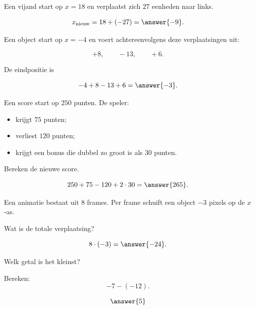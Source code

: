\documentclass{ximera}
\begin{document}
\begin{problem}
Een vijand start op $x=18$ en verplaatst zich $27$ eenheden naar links.

\[
x_{\text{nieuw}}=18+(-27)=\answer{-9}.
\]
\end{problem}

\begin{problem}
Een object start op $x=-4$ en voert achtereenvolgens deze verplaatsingen uit:

\[
+8,\qquad -13,\qquad +6.
\]

De eindpositie is

\[
-4+8-13+6=\answer{-3}.
\]
\end{problem}

\begin{problem}
Een score start op $250$ punten. De speler:

\begin{itemize}
    \item krijgt $75$ punten;
    \item verliest $120$ punten;
    \item krijgt een bonus die dubbel zo groot is als $30$ punten.
\end{itemize}

Bereken de nieuwe score.

\[
250+75-120+2\cdot30=\answer{265}.
\]
\end{problem}

\begin{problem}
Een animatie bestaat uit $8$ frames. Per frame schuift een object $-3$ pixels
op de $x$-as.

Wat is de totale verplaatsing?

\[
8\cdot(-3)=\answer{-24}.
\]
\end{problem}


\begin{problem}
Welk getal is het kleinst?

\begin{multipleChoice}
\end{multipleChoice}
\end{problem}

\begin{problem}
Bereken:
\[
-7-(-12).
\]

\[
\answer{5}
\]
\end{problem}
\end{document}
